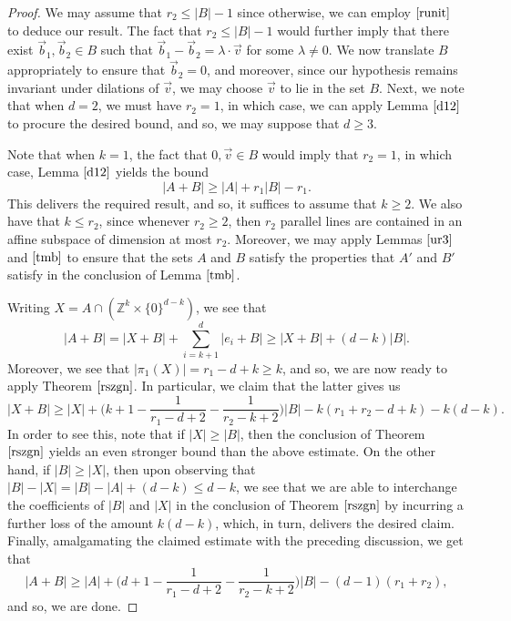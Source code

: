 \begin{proof}
We may assume that $r_2 \leq |B| -1$ since otherwise, we can employ $\eqref{runit}$ to deduce our result. The fact that $r_2 \leq |B|-1$ would further imply that there exist $\vec{b}_1, \vec{b}_2 \in B$ such that $\vec{b}_1 - \vec{b}_2  = \lambda \cdot \vec{v}$ for some $\lambda \neq 0$. We now translate $B$ appropriately to ensure that $\vec{b}_2 = 0$, and moreover, since our hypothesis remains invariant under dilations of $\vec{v}$, we may choose $\vec{v}$ to lie in the set $B$.  Next, we note that when $d = 2$, we must have $r_2 = 1$, in which case, we can apply Lemma $\ref{d12}$ to procure the desired bound, and so, we may suppose that $d \geq 3$. 
 \par
 
Note that when $k=1$, the fact that $0, \vec{v} \in B$ would imply that $r_2 = 1$, in which case, Lemma $\ref{d12}$ yields the bound
\[ |A+B|  \geq |A| + r_1 |B| - r_1. \]
This delivers the required result, and so, it suffices to assume that $k \geq 2$. We also have that $k \leq r_2$, since whenever $r_2 \geq 2$, then $r_2$ parallel lines are contained in an affine subspace of dimension at most $r_2$. Moreover, we may apply Lemmas $\ref{ur3}$ and $\ref{tmb}$ to ensure that the sets $A$ and $B$ satisfy the properties that $A'$ and $B'$ satisfy in the conclusion of Lemma $\ref{tmb}$. 
\par

Writing $X = A \cap (\mathbb{Z}^k \times \{0\}^{d-k})$, we see that
\[ |A+B| = |X+B| + \sum_{i=k+1}^{d} |e_{i} + B| \geq |X+B| + (d-k)|B|. \]
Moreover, we see that $|\pi_{1}(X)| = r_1 - d +k \geq k$, and so, we are now ready to apply Theorem $\ref{rszgn}$. In particular, we claim that the latter gives us
\[ |X+B| \geq  |X| + \bigg( k+1 - \frac{1}{r_1 - d + 2} - \frac{1}{r_2 - k + 2} \bigg)|B| - k(r_1 +r_2 - d +k ) -k(d-k).  \]
In order to see this, note that if $|X| \geq |B|$, then the conclusion of Theorem $\ref{rszgn}$ yields an even stronger bound than the above estimate. On the other hand, if $|B| \geq |X|$, then upon observing that $|B| - |X| = |B| - |A| + (d-k) \leq d-k$, we see that we are able to interchange the coefficients of $|B|$ and $|X|$ in  the conclusion of Theorem $\ref{rszgn}$ by incurring a further loss of the amount $k(d-k)$, which, in turn, delivers the desired claim. Finally, amalgamating the claimed estimate with the preceding discussion, we get that
\[ |A+B| \geq |A| + \bigg( d+1 - \frac{1}{r_1 - d + 2} - \frac{1}{r_2 - k + 2} \bigg)|B| - (d-1)(r_1 + r_2) , \]
and so, we are done.
\end{proof}
